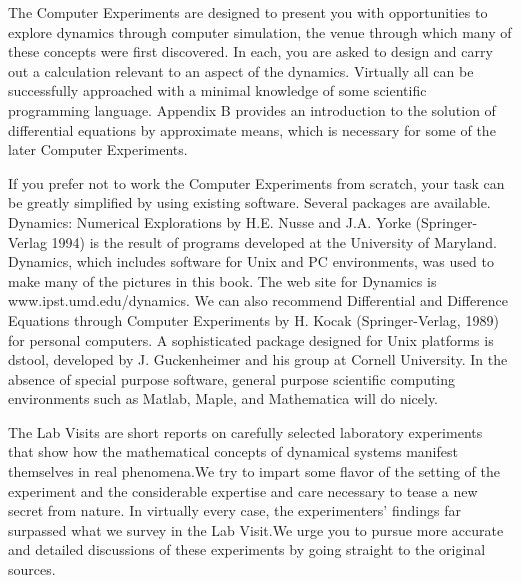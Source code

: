 \documentclass{article}
\begin{document}
The Computer Experiments are designed to present you with opportunities
to explore dynamics through computer simulation, the venue through which
many of these concepts were first discovered. In each, you are asked to design
and carry out a calculation relevant to an aspect of the dynamics. Virtually all
can be successfully approached with a minimal knowledge of some scientific
programming language. Appendix B provides an introduction to the solution of
differential equations by approximate means, which is necessary for some of the
later Computer Experiments.

If you prefer not to work the Computer Experiments from scratch, your
task can be greatly simplified by using existing software. Several packages
are available. Dynamics: Numerical Explorations by H.E. Nusse and J.A. Yorke
(Springer-Verlag 1994) is the result of programs developed at the University of
Maryland. Dynamics, which includes software for Unix and PC environments,
was used to make many of the pictures in this book. The web site for Dynamics
is www.ipst.umd.edu/dynamics. We can also recommend Differential and
Difference Equations through Computer Experiments by H. Kocak (Springer-Verlag,
1989) for personal computers. A sophisticated package designed for Unix platforms
is dstool, developed by J. Guckenheimer and his group at Cornell University.
In the absence of special purpose software, general purpose scientific computing
environments such as Matlab, Maple, and Mathematica will do nicely.

The Lab Visits are short reports on carefully selected laboratory experiments
that show how the mathematical concepts of dynamical systems manifest
themselves in real phenomena.We try to impart some flavor of the setting of the
experiment and the considerable expertise and care necessary to tease a new secret
from nature. In virtually every case, the experimenters’ findings far surpassed
what we survey in the Lab Visit.We urge you to pursue more accurate and detailed
discussions of these experiments by going straight to the original sources.
\end{document}
